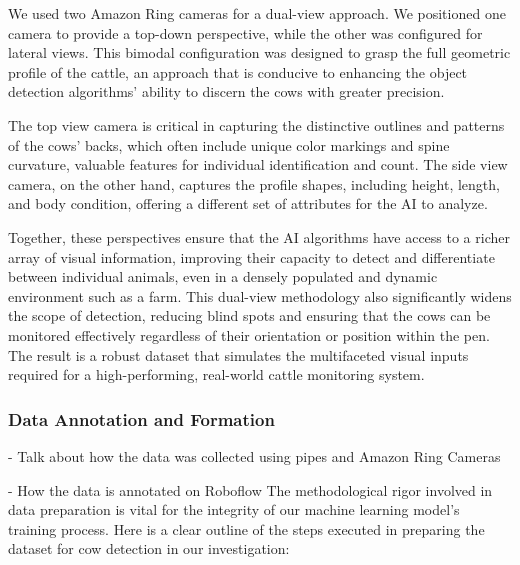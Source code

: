 We used two Amazon Ring cameras for a dual-view approach. We positioned one camera to provide a top-down perspective, while the other was configured for lateral views. This bimodal configuration was designed to grasp the full geometric profile of the cattle, an approach that is conducive to enhancing the object detection algorithms' ability to discern the cows with greater precision.

The top view camera is critical in capturing the distinctive outlines and patterns of the cows' backs, which often include unique color markings and spine curvature, valuable features for individual identification and count. The side view camera, on the other hand, captures the profile shapes, including height, length, and body condition, offering a different set of attributes for the AI to analyze.

Together, these perspectives ensure that the AI algorithms have access to a richer array of visual information, improving their capacity to detect and differentiate between individual animals, even in a densely populated and dynamic environment such as a farm. This dual-view methodology also significantly widens the scope of detection, reducing blind spots and ensuring that the cows can be monitored effectively regardless of their orientation or position within the pen. The result is a robust dataset that simulates the multifaceted visual inputs required for a high-performing, real-world cattle monitoring system.



\subsubsection*{Data Annotation and Formation}

- Talk about how the data was collected using pipes and Amazon Ring Cameras

- How the data is annotated on Roboflow
The methodological rigor involved in data preparation is vital for the integrity of our machine learning model's training process. Here is a clear outline of the steps executed in preparing the dataset for cow detection in our investigation:

